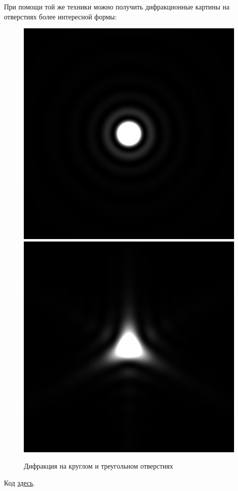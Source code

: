 \documentclass{ncc}
\begin{document}
При помощи той же техники можно получить дифракционные картины на отверстиях более интересной формы:

\begin{figure}[h!]
\center
\includegraphics[width=.3\textwidth]{2015-10-12-difraction-circle.png}
\hfil
\includegraphics[width=.3\textwidth]{2015-10-12-difraction-triangle.png}
\caption{Дифракция на круглом и треугольном отверстиях}
\end{figure}

Код \href{https://github.com/citrux/difraction}{здесь}.
\end{document}
